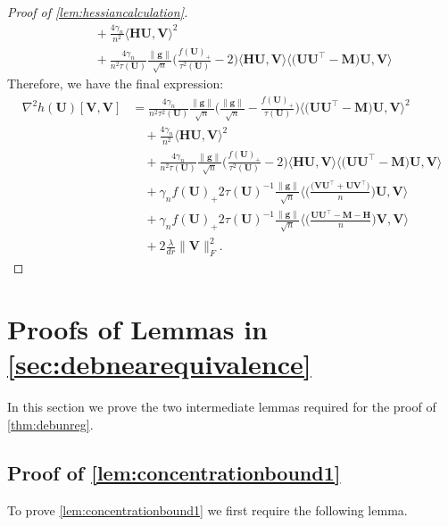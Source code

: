 \documentclass[10pt]{article}
\renewcommand{\t}{^{\top}}
\newcommand{\inv}{^{-1}}
\theoremstyle{definition}
\begin{document}
\begin{proof}[Proof of \cref{lem:hessiancalculation}]
\begin{align}
    &\quad + \frac{4\gamma_n}{n^2} \bigg \langle \bm{HU}, \bm{V} \bigg\rangle^2 \\
    &\quad + \frac{4 \gamma_n}{n^2 \tau(\bm{U})} \frac{\|\bm{g}\|}{\sqrt{n}} \bigg( \frac{f(\bm{U})_+}{\tau^2(\bm{U})} - 2 \bigg) \bigg \langle \bm{HU}, \bm{V} \bigg \rangle \bigg \langle \big( \bm{UU}\t - \bm{M} \big) \bm{U}, \bm{V} \bigg \rangle 
\end{align}
Therefore, we have the final expression:
\begin{align}
    \nabla^2 h(\bm{U})[ \bm{V}, \bm{V}] &=  \frac{4 \gamma_n}{n^2 \tau^2(\bm{U})} \frac{\|\bm{g}\|}{\sqrt{n}} \bigg( \frac{\|\bm{g}\|}{\sqrt{n}} - \frac{f(\bm{U})_+}{\tau(\bm{U})} \bigg) \bigg \langle \big( \bm{UU}\t - \bm{M}\big) \bm{U}, \bm{V} \bigg \rangle^2 \\
    &\quad + \frac{4\gamma_n}{n^2} \bigg \langle \bm{HU}, \bm{V} \bigg\rangle^2 \\
    &\quad + \frac{4 \gamma_n}{n^2 \tau(\bm{U})} \frac{\|\bm{g}\|}{\sqrt{n}} \bigg( \frac{f(\bm{U})_+}{\tau^2(\bm{U})} - 2 \bigg) \bigg \langle \bm{HU}, \bm{V} \bigg \rangle \bigg \langle \big( \bm{UU}\t - \bm{M} \big) \bm{U}, \bm{V} \bigg \rangle \\
    &\quad +\gamma_n f(\bm{U})_+ 2\tau(\bm{U})\inv \frac{\|\bm{g}\|}{\sqrt{n}}  \bigg\langle \bigg(  \frac{\big(  \bm{VU}\t +  \bm{UV}\t \big) }{n}  \bigg)\bm{U}, \bm{V} \bigg \rangle \\
    &\quad +\gamma_n f(\bm{U})_+ 2\tau(\bm{U})\inv \frac{\|\bm{g}\|}{\sqrt{n}}  \bigg\langle \bigg(  \frac{\bm{UU}\t - \bm{M}- \bm{H}}{n}  \bigg) \bm{V} , \bm{V} \bigg \rangle \\
    &\quad + 2 \frac{\lambda}{dr} \| \bm{V} \|_F^2.
\end{align}
 
\end{proof}






\section{Proofs of Lemmas in \cref{sec:debnearequivalence}}

\label{sec:debunreg}

In this section we prove the two intermediate lemmas required for the proof of \cref{thm:debunreg}.  






\subsection{Proof of \cref{lem:concentrationbound1}} \label{sec:concentrationbound1proof}
To prove \cref{lem:concentrationbound1} we first require the following lemma.
\end{document}
